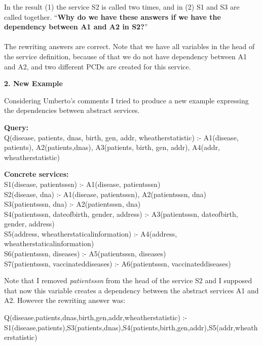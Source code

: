 \documentclass[12pt,a4paper,oneside]{report}
\begin{document}
In the result (1) the service S2 is called two times, and in (2) S1 and S3 are called together. ``\textbf{Why do we have these answers if we have the dependency between A1 and A2 in S2?}''
\\
\\
The rewriting answers are correct. Note that we have all variables in the head of the service definition, because of that we do not have dependency between A1 and A2, and two different PCDs are created for this service.

\begin{flushleft}
\textbf{2. New Example}
\end{flushleft}

Considering Umberto's comments I tried to produce a new example expressing the dependencies between abstract services.

\begin{flushleft}
\textbf{Query:} \\
Q(disease, patients, dnas, birth, gen, addr, wheatherstatistic) :- A1(disease, patients), A2(patients,dnas), A3(patients, birth, gen, addr), A4(addr, wheatherstatistic) \\
\end{flushleft}

\begin{flushleft}
\textbf{Concrete services:} \\
S1(disease, patientsssn) :- A1(disease, patientsssn)\\
S2(disease, dna) :- A1(disease, patientsssn), A2(patientsssn, dna)\\
S3(patientsssn, dna) :- A2(patientsssn, dna)\\
S4(patientsssn, dateofbirth, gender, address) :- A3(patientsssn, dateofbirth, gender, address)\\
S5(address, wheatherstaticalinformation) :- A4(address, wheatherstaticalinformation)\\
S6(patientsssn, diseases) :- A5(patientsssn, diseases)\\
S7(patientsssn, vaccinateddiseases) :- A6(patientsssn, vaccinateddiseases)\\
\end{flushleft}

Note that I removed \textit{patientsssn} from the head of the service S2 and I supposed that now this variable creates a dependency between the abstract services A1 and A2. However the rewriting answer was:

\begin{flushleft}
Q(disease,patients,dnas,birth,gen,addr,wheatherstatistic) :- S1(disease,patients),S3(patients,dnas),S4(patients,birth,gen,addr),S5(addr,wheatherstatistic)
\end{flushleft}
\end{document}

